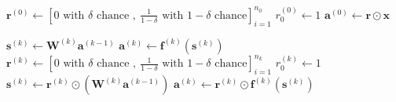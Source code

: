 \documentclass[titlepage]{article}
\begin{document}
          \begin{algorithm}
            \caption{%
              Algorithm \ref{algevaldrop} with matrix-vector notation.
            }
            \begin{algorithmic}
                \State $
                  \mathbf{r}^{(0)} \gets
                    \left[
                      0 \text{ with } \delta \text{ chance },
                      \ \frac{1}{1-\delta} \text{ with } 1-\delta \text{ chance}
                    \right]_{i=1}^{n_{0}}
                $
                \State $r_0^{(0)} \gets 1$
                \State $\mathbf{a}^{(0)} \gets \mathbf{r} \odot \mathbf{x}$

                    \State $
                      \mathbf{s}^{(k)} \gets \mathbf{W}^{(k)} \mathbf{a}^{(k-1)}
                    $
                    \State $
                      \mathbf{a}^{(k)} \gets
                        \mathbf{f}^{(k)} \left( \mathbf{s}^{(k)} \right)
                    $
                  \Else
                    \State $
                      \mathbf{r}^{(k)} \gets
                        \left[
                          0 \text{ with } \delta \text{ chance },
                          \ \frac{1}{1-\delta} \text{ with } 1-\delta \text{ chance}
                        \right]_{i=1}^{n_k}
                    $
                    \State $r_0^{(k)} \gets 1$
                    \State $
                      \mathbf{s}^{(k)} \gets
                        \mathbf{r}^{(k)}
                        \odot
                        \left( \mathbf{W}^{(k)} \mathbf{a}^{(k-1)} \right)
                    $
                    \State $
                      \mathbf{a}^{(k)} \gets
                        \mathbf{r}^{(k)}
                        \odot
                        \mathbf{f}^{(k)} \left( \mathbf{s}^{(k)} \right)
                    $
                  \EndIf
                \EndFor
              \EndProcedure
            \end{algorithmic}
          \end{algorithm}
\end{document}
